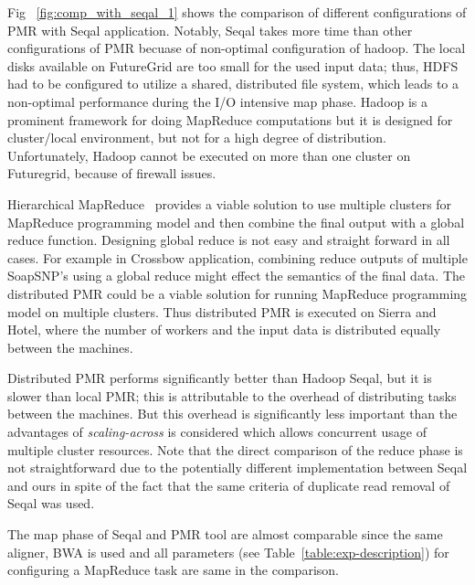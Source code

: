 \documentclass{acm_proc_article-sp}
\begin{document}
Fig ~\ref{fig:comp_with_seqal_1} shows the comparison of different
configurations of PMR with Seqal application.  Notably, Seqal takes
more time than other configurations of PMR becuase of non-optimal
configuration of hadoop.  The local disks available on FutureGrid are
too small for the used input data; thus, HDFS had to be configured to
utilize a shared, distributed file system, which leads to a
non-optimal performance during the I/O intensive map phase. Hadoop is
a prominent framework for doing MapReduce computations but it is
designed for cluster/local environment, but not for a high degree of
distribution. Unfortunately, Hadoop cannot be executed on more than
one cluster on Futuregrid, because of firewall issues.

Hierarchical MapReduce~\cite{ecmls11-mr-autodock} provides a viable
solution to use multiple clusters for MapReduce programming model and
then combine the final output with a global reduce function. Designing
global reduce is not easy and straight forward in all cases. For
example in Crossbow application, combining reduce outputs of multiple
SoapSNP's using a global reduce might effect the semantics of the
final data. The distributed PMR could be a viable solution for running
MapReduce programming model on multiple clusters. Thus distributed PMR
is executed on Sierra and Hotel, where the number of workers and the
input data is distributed equally between the machines.

Distributed PMR performs significantly better than Hadoop Seqal, but
it is slower than local PMR; this is attributable to the overhead of
distributing tasks between the machines.  But this overhead is
significantly less important than the advantages of
\textit{scaling-across} is considered which allows concurrent usage of
multiple cluster resources. Note that the direct comparison of the
reduce phase is not straightforward due to the potentially different
implementation between Seqal and ours   in spite of the fact that the same
criteria of duplicate read removal of Seqal\cite{seal_2011_mapred} was
used.

The map phase of Seqal and PMR tool are almost comparable since
the same aligner, BWA is used and all parameters (see
Table~\ref{table:exp-description}) for configuring a MapReduce task
are same in the comparison.

\end{document}
